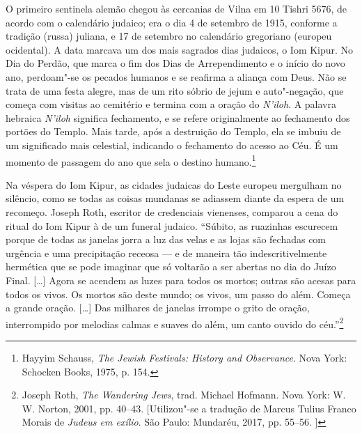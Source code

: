 \begin{epigraphs} 
\end{epigraphs}

O primeiro sentinela alemão chegou às cercanias de Vilna em 10 Tishri
5676, de acordo com o calendário judaico; era o dia 4 de setembro de
1915, conforme a tradição (russa) juliana, e 17 de setembro no
calendário gregoriano (europeu ocidental). A data marcava um dos mais
sagrados dias judaicos, o Iom Kipur. No Dia do Perdão, que marca o fim
dos Dias de Arrependimento e o início do novo ano, perdoam"-se os pecados
humanos e se reafirma a aliança com Deus. Não se trata de uma festa
alegre, mas de um rito sóbrio de jejum e auto"-negação, que começa com
visitas ao cemitério e termina com a oração do \textit{N'iloh}. A palavra
hebraica \textit{N'iloh} significa fechamento, e se refere originalmente
ao fechamento dos portões do Templo. Mais tarde, após a destruição do
Templo, ela se imbuiu de um significado mais celestial, indicando o
fechamento do acesso ao Céu. É um momento de passagem do ano que sela o
destino humano.\footnote{Hayyim Schauss, \textit{The Jewish Festivals: History and Observance}. Nova York: Schocken Books, 1975, p. 154.}

Na véspera do Iom Kipur, as cidades judaicas do Leste europeu mergulham
no silêncio, como se todas as coisas mundanas se adiassem diante da
espera de um recomeço. Joseph Roth, escritor de credenciais vienenses,
comparou a cena do ritual do Iom Kipur à de um funeral judaico.
``Súbito, as ruazinhas escurecem porque de todas as janelas jorra a luz
das velas e as lojas são fechadas com urgência e uma precipitação
receosa --- e de maneira tão indescritivelmente hermética que se pode
imaginar que só voltarão a ser abertas no dia do Juízo Final.
{[}\ldots{}{]} Agora se acendem as luzes para todos os mortos; outras
são acesas para todos os vivos. Os mortos são deste mundo; os vivos, um
passo do além. Começa a grande oração. {[}\ldots{}{]} Das milhares de
janelas irrompe o grito de oração, interrompido por melodias calmas e
suaves do além, um canto ouvido do céu.''\footnote{Joseph Roth, \textit{The Wandering Jews}, trad. Michael Hofmann. Nova York: W.\,W. Norton, 2001, pp. 40--43. [Utilizou"-se a tradução de Marcus Tulius Franco Morais de \textit{Judeus em exílio}. São Paulo: Mundaréu, 2017, pp. 55--56. ]}

